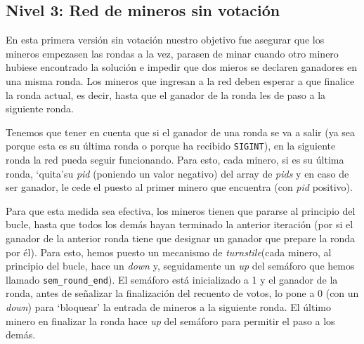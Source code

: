 \documentclass{article}
\begin{document}
\subsection*{Nivel 3: Red de mineros sin votación}

En esta primera versión sin votación nuestro objetivo fue asegurar que los mineros empezasen las rondas a la vez, parasen de minar cuando otro minero hubiese encontrado la solución e impedir que dos mieros se declaren ganadores en una misma ronda. Los mineros que ingresan a la red deben esperar a que finalice la ronda actual, es decir, hasta que el ganador de la ronda les de paso a la siguiente ronda.

Tenemos que tener en cuenta que si el ganador de una ronda se va a salir (ya sea porque esta es su última ronda o porque ha recibido \texttt{SIGINT}), en la siguiente ronda la red pueda seguir funcionando. Para esto, cada minero, si es su última ronda, `quita'\footnotemark su \textit{pid} (poniendo un valor negativo) del array de \textit{pids} y en caso de ser ganador, le cede el puesto al primer minero que encuentra (con \emph{pid} positivo).


Para que esta medida sea efectiva, los mineros tienen que pararse al principio del bucle, hasta que todos los demás hayan terminado la anterior iteración (por si el ganador de la anterior ronda tiene que designar un ganador que prepare la ronda por él). Para esto, hemos puesto un mecanismo de \textit{turnstile}\footnotemark (cada minero, al principio del bucle, hace un \textit{down} y, seguidamente un \textit{up} del semáforo que hemos llamado \texttt{sem\_round\_end}). El semáforo está inicializado a 1 y el ganador de la ronda, antes de señalizar la finalización del recuento de votos, lo pone a 0 (con un \textit{down}) para `bloquear' la entrada
de mineros a la siguiente ronda. El último minero en finalizar la ronda hace \textit{up} del semáforo para permitir el paso a los demás.


\end{document}
